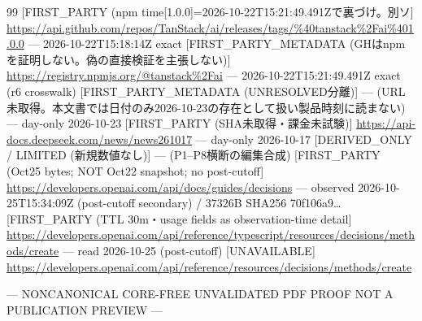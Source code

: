 \documentclass[lualatex,a4paper,10pt]{jlreq}
\begin{document}
{\begin{thebibliography}{99}
 [FIRST\_PARTY (npm time[1.0.0]=2026-10-22T15:21:49.491Zで裏づけ。別ソ] \url{https://api.github.com/repos/TanStack/ai/releases/tags/%40tanstack%2Fai%401.0.0} --- 2026-10-22T15:18:14Z exact
 [FIRST\_PARTY\_METADATA (GHはnpmを証明しない。偽の直接検証を主張しない)] \url{https://registry.npmjs.org/@tanstack%2Fai} --- 2026-10-22T15:21:49.491Z exact (r6 crosswalk)
 [FIRST\_PARTY\_METADATA (UNRESOLVED分離)] — (URL未取得。本文書では日付のみ2026-10-23の存在として扱い製品時刻に読まない) --- day-only 2026-10-23
 [FIRST\_PARTY (SHA未取得・課金未試験)] \url{https://api-docs.deepseek.com/news/news261017} --- day-only 2026-10-17
 [DERIVED\_ONLY / LIMITED (新規数値なし)] — (P1–P8横断の編集合成)
 [FIRST\_PARTY (Oct25 bytes; NOT Oct22 snapshot; no post-cutoff] \url{https://developers.openai.com/api/docs/guides/decisions} --- observed 2026-10-25T15:34:09Z (post-cutoff secondary) / 37326B SHA256 70f106a9…
 [FIRST\_PARTY (TTL 30m・usage fields as observation-time detail] \url{https://developers.openai.com/api/reference/typescript/resources/decisions/methods/create} --- read 2026-10-25 (post-cutoff)
 [UNAVAILABLE] \url{https://developers.openai.com/api/reference/resources/decisions/methods/create} 
\end{thebibliography}}

\begin{center}\color{SurveyMuted}--- NONCANONICAL CORE-FREE UNVALIDATED PDF PROOF \quad NOT A PUBLICATION PREVIEW ---\end{center}
\end{document}

